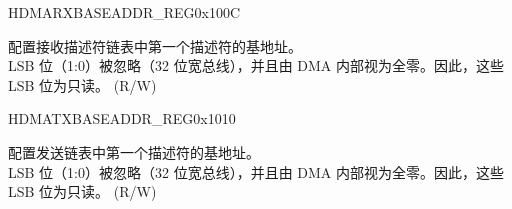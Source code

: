 \begin{register}{H}{DMARXBASEADDR\_REG}{0x100C}\label{regdesc:DMARXBASEADDRREG}
%
\regnewline%
\begin{regdesc}\begin{reglist}
\item [START\_RECV\_LIST] 配置接收描述符链表中第一个描述符的基地址。\\
LSB 位（1:0）被忽略（32 位宽总线），并且由 DMA 内部视为全零。因此，这些 LSB 位为只读。 (R/W)
\end{reglist}\end{regdesc}
\end{register}


\begin{register}{H}{DMATXBASEADDR\_REG}{0x1010}\label{regdesc:DMATXBASEADDRREG}
%
\regnewline%
\begin{regdesc}\begin{reglist}
\item [START\_TRANS\_LIST] 配置发送链表中第一个描述符的基地址。\\
LSB 位（1:0）被忽略（32 位宽总线），并且由 DMA 内部视为全零。因此，这些 LSB 位为只读。 (R/W)
\end{reglist}\end{regdesc}
\end{register}


